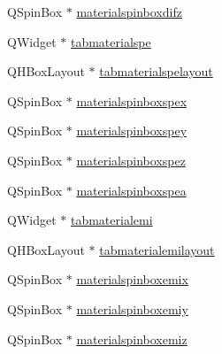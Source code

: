 \begin{DoxyCompactItemize}
Q\+Spin\+Box $\ast$ \hyperlink{class_mondock_abaa05027f2871448e35b82516e0559b8}{materialspinboxdifz}
\item 
Q\+Widget $\ast$ \hyperlink{class_mondock_a7f99e6c98995aa1e236e44be190e0fa6}{tabmaterialspe}
\item 
Q\+H\+Box\+Layout $\ast$ \hyperlink{class_mondock_a705948bf976e373b5afb90c9f0641580}{tabmaterialspelayout}
\item 
Q\+Spin\+Box $\ast$ \hyperlink{class_mondock_a964af1b06eda72c95695ff25146892ec}{materialspinboxspex}
\item 
Q\+Spin\+Box $\ast$ \hyperlink{class_mondock_a38fad0c6901791690bdedba633bc3220}{materialspinboxspey}
\item 
Q\+Spin\+Box $\ast$ \hyperlink{class_mondock_ab5e93ab98c43f314fa48b84be8098beb}{materialspinboxspez}
\item 
Q\+Spin\+Box $\ast$ \hyperlink{class_mondock_a62de223ddabe875e9406fd43b892a8a0}{materialspinboxspea}
\item 
Q\+Widget $\ast$ \hyperlink{class_mondock_af4e2b3e87db243b8813a3e71cbf9dd7d}{tabmaterialemi}
\item 
Q\+H\+Box\+Layout $\ast$ \hyperlink{class_mondock_afc37221d5733642eeeeaf93042d72dcb}{tabmaterialemilayout}
\item 
Q\+Spin\+Box $\ast$ \hyperlink{class_mondock_a003c7eff97a356c6dc6d7f892719e91f}{materialspinboxemix}
\item 
Q\+Spin\+Box $\ast$ \hyperlink{class_mondock_a92982a92a14d612a49dd027cb68b6d73}{materialspinboxemiy}
\item 
Q\+Spin\+Box $\ast$ \hyperlink{class_mondock_ab95fca34ebe4db052bab4109eaf5afd1}{materialspinboxemiz}
\end{DoxyCompactItemize}


